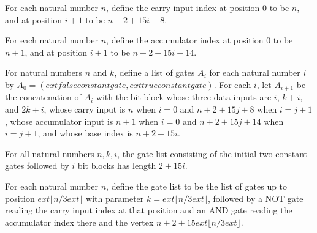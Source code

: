 \begin{definition}
\label{BoolCircuit.RippleCarry.cinIdx}
\leanok
For each natural number $n$, define the carry input index at position $0$ to be $n$, and
at position $i+1$ to be $n+2+15i+8$.
\end{definition}

\begin{definition}
\label{BoolCircuit.RippleCarry.accIdx}
\leanok
For each natural number $n$, define the accumulator index at position $0$ to be $n+1$,
and at position $i+1$ to be $n+2+15i+14$.
\end{definition}

\begin{definition}
\label{BoolCircuit.RippleCarry.adderGatesUpTo}
\leanok
{}
For natural numbers $n$ and $k$, define a list of gates $A_i$ for each natural number
$i$ by $A_0=(	ext{false constant gate},	ext{ true constant gate})$. For each $i$, let
$A_{i+1}$ be the concatenation of $A_i$ with the bit block whose three data inputs are
$i$, $k+i$, and $2k+i$, whose carry input is $n$ when $i=0$ and $n+2+15j+8$ when
$i=j+1$, whose accumulator input is $n+1$ when $i=0$ and $n+2+15j+14$ when $i=j+1$, and
whose base index is $n+2+15i$.
\end{definition}

\begin{theorem}
\label{BoolCircuit.RippleCarry.length_adderGatesUpTo}
\leanok
{}
For all natural numbers $n,k,i$, the gate list consisting of the initial two constant
gates followed by $i$ bit blocks has length $2+15i$.
\end{theorem}

\begin{definition}
\label{BoolCircuit.adderGates}
\leanok
{}
For each natural number $n$, define the gate list to be the list of gates up to position
$	ext{⌊}n/3	ext{⌋}$ with parameter $k=	ext{⌊}n/3	ext{⌋}$, followed by a NOT gate reading
the carry input index at that position and an AND gate reading the accumulator index
there and the vertex $n+2+15	ext{⌊}n/3	ext{⌋}$.
\end{definition}

